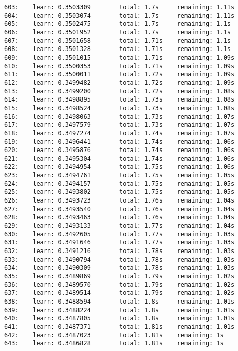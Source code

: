 \documentclass[11pt]{article}
\begin{document}
\begin{Verbatim}[commandchars=\\\{\}]
603:    learn: 0.3503309        total: 1.7s     remaining: 1.11s
604:    learn: 0.3503074        total: 1.7s     remaining: 1.11s
605:    learn: 0.3502475        total: 1.7s     remaining: 1.1s
606:    learn: 0.3501952        total: 1.7s     remaining: 1.1s
607:    learn: 0.3501658        total: 1.71s    remaining: 1.1s
608:    learn: 0.3501328        total: 1.71s    remaining: 1.1s
609:    learn: 0.3501015        total: 1.71s    remaining: 1.09s
610:    learn: 0.3500353        total: 1.71s    remaining: 1.09s
611:    learn: 0.3500011        total: 1.72s    remaining: 1.09s
612:    learn: 0.3499482        total: 1.72s    remaining: 1.09s
613:    learn: 0.3499200        total: 1.72s    remaining: 1.08s
614:    learn: 0.3498895        total: 1.73s    remaining: 1.08s
615:    learn: 0.3498524        total: 1.73s    remaining: 1.08s
616:    learn: 0.3498063        total: 1.73s    remaining: 1.07s
617:    learn: 0.3497579        total: 1.73s    remaining: 1.07s
618:    learn: 0.3497274        total: 1.74s    remaining: 1.07s
619:    learn: 0.3496441        total: 1.74s    remaining: 1.06s
620:    learn: 0.3495876        total: 1.74s    remaining: 1.06s
621:    learn: 0.3495304        total: 1.74s    remaining: 1.06s
622:    learn: 0.3494954        total: 1.75s    remaining: 1.06s
623:    learn: 0.3494761        total: 1.75s    remaining: 1.05s
624:    learn: 0.3494157        total: 1.75s    remaining: 1.05s
625:    learn: 0.3493802        total: 1.75s    remaining: 1.05s
626:    learn: 0.3493723        total: 1.76s    remaining: 1.04s
627:    learn: 0.3493540        total: 1.76s    remaining: 1.04s
628:    learn: 0.3493463        total: 1.76s    remaining: 1.04s
629:    learn: 0.3493133        total: 1.77s    remaining: 1.04s
630:    learn: 0.3492605        total: 1.77s    remaining: 1.03s
631:    learn: 0.3491646        total: 1.77s    remaining: 1.03s
632:    learn: 0.3491216        total: 1.78s    remaining: 1.03s
633:    learn: 0.3490794        total: 1.78s    remaining: 1.03s
634:    learn: 0.3490309        total: 1.78s    remaining: 1.03s
635:    learn: 0.3489869        total: 1.79s    remaining: 1.02s
636:    learn: 0.3489570        total: 1.79s    remaining: 1.02s
637:    learn: 0.3489514        total: 1.79s    remaining: 1.02s
638:    learn: 0.3488594        total: 1.8s     remaining: 1.01s
639:    learn: 0.3488224        total: 1.8s     remaining: 1.01s
640:    learn: 0.3487805        total: 1.8s     remaining: 1.01s
641:    learn: 0.3487371        total: 1.81s    remaining: 1.01s
642:    learn: 0.3487023        total: 1.81s    remaining: 1s
643:    learn: 0.3486828        total: 1.81s    remaining: 1s

\end{Verbatim}
\end{document}
